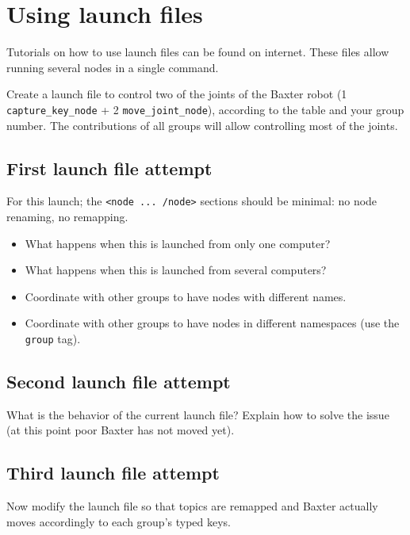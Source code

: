\documentclass{ecnreport}
\begin{document}
\section{Using launch files}

Tutorials on how to use launch files can be found on internet. These files allow running several nodes in a single command.

Create a launch file to control two of the joints of the Baxter robot (1 \texttt{capture\_key\_node} + 2 \texttt{move\_joint\_node}), according to the table
and your group number. The contributions of all groups will allow controlling most of the joints. 

\subsection{First launch file attempt}

For this launch; the \texttt{<node ... /node>} sections should be minimal: no node renaming, no remapping.

\begin{itemize}
 \item What happens when this is launched from only one computer?
 \item What happens when this is launched from several computers?
 \item Coordinate with other groups to have nodes with different names.
 \item Coordinate with other groups to have nodes in different namespaces (use the \texttt{group} tag).
\end{itemize}

\subsection{Second launch file attempt}

What is the behavior of the current launch file? Explain how to solve the issue (at this point poor Baxter has not moved yet).

\subsection{Third launch file attempt}

Now modify the launch file so that topics are remapped and Baxter actually moves accordingly to each group's typed keys.


 
\end{document}
